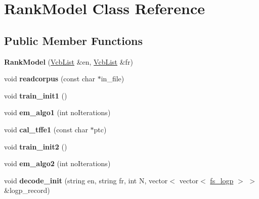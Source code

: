 \hypertarget{classRankModel}{\section{\-Rank\-Model \-Class \-Reference}
\label{classRankModel}
}
\subsection*{\-Public \-Member \-Functions}
\begin{DoxyCompactItemize}
\item 
\hypertarget{classRankModel_aa45ea5a078d0e69c8dc61492d2abdd6d}{{\bfseries \-Rank\-Model} (\hyperlink{classVcbList}{\-Vcb\-List} \&en, \hyperlink{classVcbList}{\-Vcb\-List} \&fr)}\label{classRankModel_aa45ea5a078d0e69c8dc61492d2abdd6d}

\item 
\hypertarget{classRankModel_acb50c4a4d2ebb90dc1d85979ef8e4e02}{void {\bfseries readcorpus} (const char $\ast$in\-\_\-file)}\label{classRankModel_acb50c4a4d2ebb90dc1d85979ef8e4e02}

\item 
\hypertarget{classRankModel_a8760fce694d986e65ee26e2bc31de6eb}{void {\bfseries train\-\_\-init1} ()}\label{classRankModel_a8760fce694d986e65ee26e2bc31de6eb}

\item 
\hypertarget{classRankModel_ab41b597908fca1235b8349eaa4a151ec}{void {\bfseries em\-\_\-algo1} (int no\-Iterations)}\label{classRankModel_ab41b597908fca1235b8349eaa4a151ec}

\item 
\hypertarget{classRankModel_aef777c80ba719f9acf3397067fdc8d00}{void {\bfseries cal\-\_\-tffe1} (const char $\ast$ptc)}\label{classRankModel_aef777c80ba719f9acf3397067fdc8d00}

\item 
\hypertarget{classRankModel_a362c397a5d0978a4e4022958ef912201}{void {\bfseries train\-\_\-init2} ()}\label{classRankModel_a362c397a5d0978a4e4022958ef912201}

\item 
\hypertarget{classRankModel_a86d4d6f5965ab9606f40f8a5612f0e41}{void {\bfseries em\-\_\-algo2} (int no\-Iterations)}\label{classRankModel_a86d4d6f5965ab9606f40f8a5612f0e41}

\item 
\hypertarget{classRankModel_a314a1afa00ba8238e787b91b4ca27e57}{void {\bfseries decode\-\_\-init} (string en, string fr, int \-N, vector$<$ vector$<$ \hyperlink{classfs__logp}{fs\-\_\-logp} $>$ $>$ \&logp\-\_\-record)}\label{classRankModel_a314a1afa00ba8238e787b91b4ca27e57}


\end{DoxyCompactItemize}
